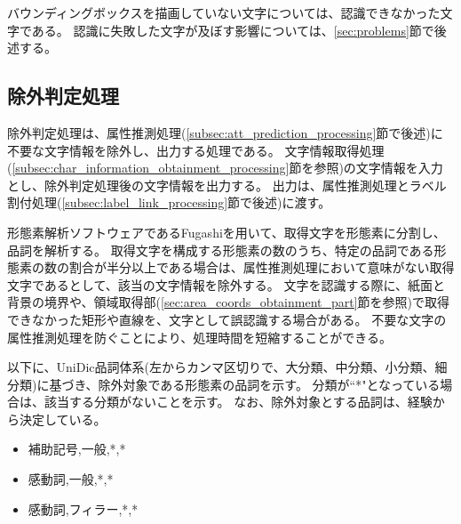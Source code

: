バウンディングボックスを描画していない文字については、認識できなかった文字である。
認識に失敗した文字が及ぼす影響については、\ref{sec:problems}節で後述する。

\subsection{除外判定処理}\label{subsec:exclusion_judgement_processing}
除外判定処理は、属性推測処理(\ref{subsec:att_prediction_processing}節で後述)に不要な文字情報を除外し、出力する処理である。
文字情報取得処理(\ref{subsec:char_information_obtainment_processing}節を参照)の文字情報を入力とし、除外判定処理後の文字情報を出力する。
出力は、属性推測処理とラベル割付処理(\ref{subsec:label_link_processing}節で後述)に渡す。

形態素解析ソフトウェアであるFugashiを用いて、取得文字を形態素に分割し、品詞を解析する。
取得文字を構成する形態素の数のうち、特定の品詞である形態素の数の割合が半分以上である場合は、属性推測処理において意味がない取得文字であるとして、該当の文字情報を除外する。
文字を認識する際に、紙面と背景の境界や、領域取得部(\ref{sec:area_coords_obtainment_part}節を参照)で取得できなかった矩形や直線を、文字として誤認識する場合がある。
不要な文字の属性推測処理を防ぐことにより、処理時間を短縮することができる。

以下に、UniDic品詞体系(左からカンマ区切りで、大分類、中分類、小分類、細分類)に基づき、除外対象である形態素の品詞を示す。
分類が``*"となっている場合は、該当する分類がないことを示す。
なお、除外対象とする品詞は、経験から決定している。

\begin{itemize}
    \item 補助記号,一般,*,*
    \item 感動詞,一般,*,*
    \item 感動詞,フィラー,*,*
\end{itemize}

